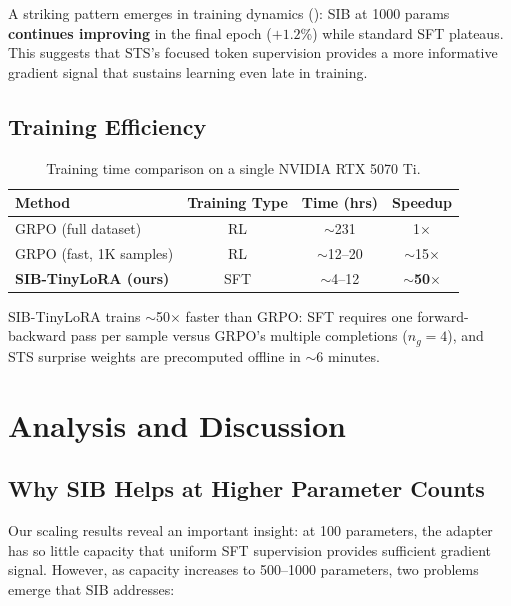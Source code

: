 \documentclass{article}
\begin{document}
A striking pattern emerges in training dynamics (): SIB at 1000 params \textbf{continues improving} in the final epoch ($+1.2$\%) while standard SFT plateaus. This suggests that STS's focused token supervision provides a more informative gradient signal that sustains learning even late in training.

\subsection{Training Efficiency}

\begin{table}[t]
\centering
\caption{Training time comparison on a single NVIDIA RTX 5070 Ti.}
\label{tab:efficiency}
\begin{tabular}{lccc}
\toprule
\textbf{Method} & \textbf{Training Type} & \textbf{Time (hrs)} & \textbf{Speedup} \\
\midrule
GRPO (full dataset)           & RL  & $\sim$231  & 1$\times$  \\
GRPO (fast, 1K samples)       & RL  & $\sim$12--20 & $\sim$15$\times$  \\
\textbf{SIB-TinyLoRA (ours)}  & SFT & $\sim$4--12  & $\sim$\textbf{50$\times$} \\
\bottomrule
\end{tabular}
\end{table}

SIB-TinyLoRA trains $\sim$50$\times$ faster than GRPO: SFT requires one forward-backward pass per sample versus GRPO's multiple completions ($n_g = 4$), and STS surprise weights are precomputed offline in $\sim$6 minutes.

\section{Analysis and Discussion}

\subsection{Why SIB Helps at Higher Parameter Counts}

Our scaling results reveal an important insight: at 100 parameters, the adapter has so little capacity that uniform SFT supervision provides sufficient gradient signal. However, as capacity increases to 500--1000 parameters, two problems emerge that SIB addresses:
\end{document}

